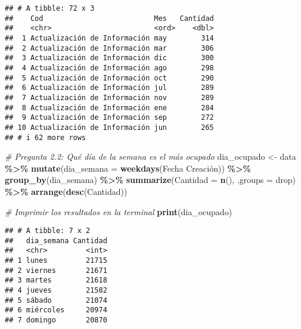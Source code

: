 \documentclass[
]{article}
\newenvironment{Shaded}{\begin{snugshade}}{\end{snugshade}}
\newcommand{\AttributeTok}[1]{\textcolor[rgb]{0.13,0.29,0.53}{#1}}
\newcommand{\CommentTok}[1]{\textcolor[rgb]{0.56,0.35,0.01}{\textit{#1}}}
\newcommand{\FunctionTok}[1]{\textcolor[rgb]{0.13,0.29,0.53}{\textbf{#1}}}
\newcommand{\NormalTok}[1]{#1}
\newcommand{\OtherTok}[1]{\textcolor[rgb]{0.56,0.35,0.01}{#1}}
\newcommand{\SpecialCharTok}[1]{\textcolor[rgb]{0.81,0.36,0.00}{\textbf{#1}}}
\newcommand{\StringTok}[1]{\textcolor[rgb]{0.31,0.60,0.02}{#1}}
\begin{document}
\begin{verbatim}
## # A tibble: 72 x 3
##    Cod                          Mes   Cantidad
##    <chr>                        <ord>    <dbl>
##  1 Actualización de Información may        314
##  2 Actualización de Información mar        306
##  3 Actualización de Información dic        300
##  4 Actualización de Información ago        298
##  5 Actualización de Información oct        290
##  6 Actualización de Información jul        289
##  7 Actualización de Información nov        289
##  8 Actualización de Información ene        284
##  9 Actualización de Información sep        272
## 10 Actualización de Información jun        265
## # i 62 more rows
\end{verbatim}

\begin{Shaded}
\begin{Highlighting}[]
\CommentTok{\# Pregunta 2.2: Qué día de la semana es el más ocupado}
\NormalTok{dia\_ocupado }\OtherTok{\textless{}{-}}\NormalTok{ data }\SpecialCharTok{\%\textgreater{}\%}
  \FunctionTok{mutate}\NormalTok{(}\AttributeTok{dia\_semana =} \FunctionTok{weekdays}\NormalTok{(}\StringTok{\textasciigrave{}}\AttributeTok{Fecha Creación}\StringTok{\textasciigrave{}}\NormalTok{)) }\SpecialCharTok{\%\textgreater{}\%}
  \FunctionTok{group\_by}\NormalTok{(dia\_semana) }\SpecialCharTok{\%\textgreater{}\%}
  \FunctionTok{summarize}\NormalTok{(}\AttributeTok{Cantidad =} \FunctionTok{n}\NormalTok{(), }\AttributeTok{.groups =} \StringTok{\textquotesingle{}drop\textquotesingle{}}\NormalTok{) }\SpecialCharTok{\%\textgreater{}\%}
  \FunctionTok{arrange}\NormalTok{(}\FunctionTok{desc}\NormalTok{(Cantidad))}

\CommentTok{\# Imprimir los resultados en la terminal}
\FunctionTok{print}\NormalTok{(dia\_ocupado)}
\end{Highlighting}
\end{Shaded}

\begin{verbatim}
## # A tibble: 7 x 2
##   dia_semana Cantidad
##   <chr>         <int>
## 1 lunes         21715
## 2 viernes       21671
## 3 martes        21618
## 4 jueves        21582
## 5 sábado        21074
## 6 miércoles     20974
## 7 domingo       20870
\end{verbatim}
\end{document}
